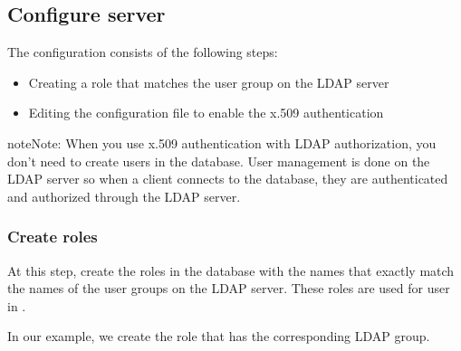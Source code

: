 \documentclass[letterpaper,10pt,english]{sphinxmanual}
\begin{document}
\subsection{Configure  server}
\label{\detokenize{x509-ldap:configure-mongod-server}}
\sphinxAtStartPar
The configuration consists of the following steps:
\begin{itemize}
\item {} 
\sphinxAtStartPar
Creating a role that matches the user group on the LDAP server

\item {} 
\sphinxAtStartPar
Editing the configuration file to enable the x.509 authentication

\end{itemize}

\begin{sphinxadmonition}{note}{Note:}
\sphinxAtStartPar
When you use x.509 authentication with LDAP authorization, you don’t need to create users in the  database.  User management is done on the LDAP server so when a client connects to the database, they are authenticated and authorized through the LDAP server.
\end{sphinxadmonition}


\subsubsection{Create roles}
\label{\detokenize{x509-ldap:create-roles}}
\sphinxAtStartPar
At this step, create the roles in the  database with the names that exactly match the names of the user groups on the LDAP server. These roles are used for user {\hyperref[\detokenize{authorization:ldap-authorization}]{}} in .

\sphinxAtStartPar
In our example, we create the role  that has the corresponding LDAP group.

\begin{sphinxVerbatim}[commandchars=\\\{\}]
\PYG{p}{[}\PYG{p}{]}
\PYG{p}{[}
\PYG{p}{]}
\end{sphinxVerbatim}
\end{document}
